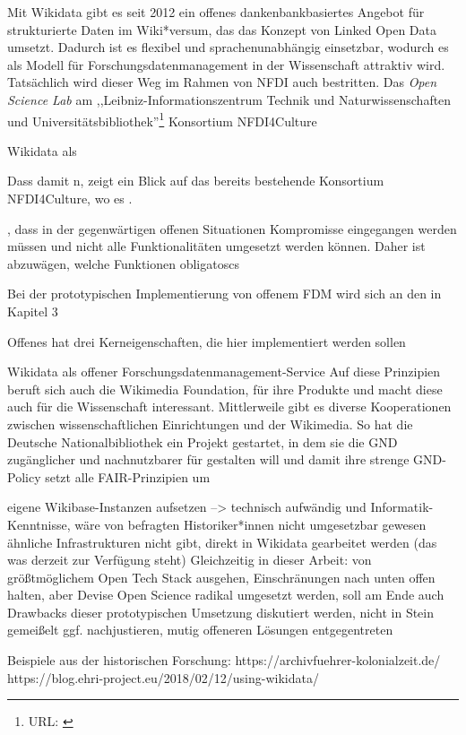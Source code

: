 Mit Wikidata gibt es seit 2012 ein offenes dankenbankbasiertes Angebot für strukturierte Daten im Wiki*versum, das das Konzept von Linked Open Data umsetzt. Dadurch ist es flexibel und sprachenunabhängig einsetzbar, wodurch es als Modell für Forschungsdatenmanagement in der Wissenschaft attraktiv wird. Tatsächlich wird dieser Weg im Rahmen von NFDI auch bestritten. Das \textit{Open Science Lab} am ,,Leibniz-Informationszentrum Technik und Naturwissenschaften und Universitätsbibliothek''\footnote{URL: \url{}} Konsortium NFDI4Culture

Wikidata als 


Dass damit n, zeigt ein Blick auf das bereits bestehende Konsortium NFDI4Culture, wo es . 




, dass in der gegenwärtigen offenen Situationen Kompromisse eingegangen werden müssen und nicht alle Funktionalitäten umgesetzt werden können. Daher ist abzuwägen, welche Funktionen obligatoscs

Bei der prototypischen Implementierung von offenem FDM wird sich an den in Kapitel 3 


Offenes  hat drei Kerneigenschaften, die hier implementiert werden sollen


Wikidata als offener Forschungsdatenmanagement-Service
Auf diese Prinzipien beruft sich auch die Wikimedia Foundation, für ihre Produkte und macht diese auch für die Wissenschaft interessant. Mittlerweile gibt es diverse Kooperationen zwischen wissenschaftlichen Einrichtungen und der Wikimedia. So hat die Deutsche Nationalbibliothek ein Projekt gestartet, in dem sie die GND zugänglicher und nachnutzbarer für gestalten will und damit ihre strenge GND-Policy
setzt alle FAIR-Prinzipien um



eigene Wikibase-Instanzen aufsetzen --> technisch aufwändig und Informatik-Kenntnisse, wäre von befragten Historiker*innen nicht umgesetzbar gewesen
ähnliche Infrastrukturen nicht gibt, direkt in Wikidata gearbeitet werden (das was derzeit zur Verfügung steht)
Gleichzeitig in dieser Arbeit: von größtmöglichem Open Tech Stack ausgehen, Einschränungen nach unten offen halten, aber Devise Open Science radikal umgesetzt werden, soll am Ende auch Drawbacks dieser prototypischen Umsetzung diskutiert werden, nicht in Stein gemeißelt ggf. nachjustieren, mutig offeneren Lösungen entgegentreten

Beispiele aus der historischen Forschung:
https://archivfuehrer-kolonialzeit.de/
https://blog.ehri-project.eu/2018/02/12/using-wikidata/


